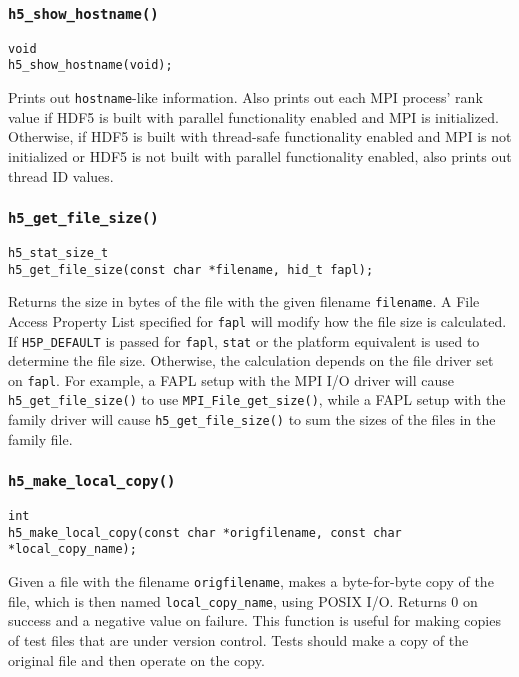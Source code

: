 \documentclass[../HDF5_RFC.tex]{subfiles}
\begin{document}
\subsubsection{\texttt{h5\_show\_hostname()}}

\begin{verbatim}
void
h5_show_hostname(void);
\end{verbatim}

Prints out \texttt{hostname}-like information. Also prints out each MPI process' rank value if
HDF5 is built with parallel functionality enabled and MPI is initialized. Otherwise, if HDF5
is built with thread-safe functionality enabled and MPI is not initialized or HDF5 is not built
with parallel functionality enabled, also prints out thread ID values.

\subsubsection{\texttt{h5\_get\_file\_size()}}

\begin{verbatim}
h5_stat_size_t
h5_get_file_size(const char *filename, hid_t fapl);
\end{verbatim}

Returns the size in bytes of the file with the given filename \texttt{filename}. A File Access Property
List specified for \texttt{fapl} will modify how the file size is calculated. If \texttt{H5P\_DEFAULT}
is passed for \texttt{fapl}, \texttt{stat} or the platform equivalent is used to determine the file size.
Otherwise, the calculation depends on the file driver set on \texttt{fapl}. For example, a FAPL setup
with the MPI I/O driver will cause \texttt{h5\_get\_file\_size()} to use \texttt{MPI\_File\_get\_size()},
while a FAPL setup with the family driver will cause \texttt{h5\_get\_file\_size()} to sum the sizes of
the files in the family file.

\subsubsection{\texttt{h5\_make\_local\_copy()}}

\begin{verbatim}
int
h5_make_local_copy(const char *origfilename, const char *local_copy_name);
\end{verbatim}

Given a file with the filename \texttt{origfilename}, makes a byte-for-byte copy of the file, which is
then named \texttt{local\_copy\_name}, using POSIX I/O. Returns 0 on success and a negative value on
failure. This function is useful for making copies of test files that are under version control. Tests
should make a copy of the original file and then operate on the copy.
\end{document}
